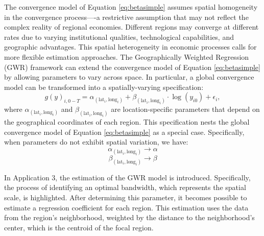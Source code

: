 \documentclass[smallextended, natbib]{svjour3}       %
\begin{document}
The convergence model of Equation \ref{eq:betasimple}  assumes spatial homogeneity in the convergence process----a restrictive assumption that may not reflect the complex reality of regional economies.
Different regions may converge at different rates due to varying institutional qualities, technological capabilities, and geographic advantages. 
This spatial heterogeneity in economic processes calls for more flexible estimation approaches.
The Geographically Weighted Regression (GWR) framework can extend the convergence model of Equation \ref{eq:betasimple} by allowing parameters to vary across space. 
In particular, a global convergence model can be transformed into a spatially-varying specification:
\begin{equation}
g(y)_{i,0-T} = \alpha_{(\text{lat}_i,\text{long}_i)} + \beta_{(\text{lat}_i,\text{long}_i)} \cdot \log(y_{i0}) + \epsilon_{i},
\label{eq:gwr}
\end{equation}
\noindent where $\alpha_{(\text{lat}_i,\text{long}_i)}$ and $\beta_{(\text{lat}_i,\text{long}_i)}$ are location-specific parameters that depend on the geographical coordinates of each region. 
This specification nests the global convergence model of Equation \ref{eq:betasimple} as a special case.
Specifically, when parameters do not exhibit spatial variation, we have:
\begin{equation}
\alpha_{(\text{lat}_i,\text{long}_i)} \rightarrow \alpha
\label{eq:convergence1}
\end{equation}
\begin{equation}
\beta_{(\text{lat}_i,\text{long}_i)} \rightarrow \beta
\label{eq:convergence2}
\end{equation}

In Application 3, the estimation of the GWR model is introduced.
Specifically, the process of identifying an optimal bandwidth, which represents the spatial scale, is highlighted.
After determining this parameter, it becomes possible to estimate a regression coefficient for each region.
This estimation uses the data from the region's neighborhood, weighted by the distance to the neighborhood's center, which is the centroid of the focal region.
\end{document}

